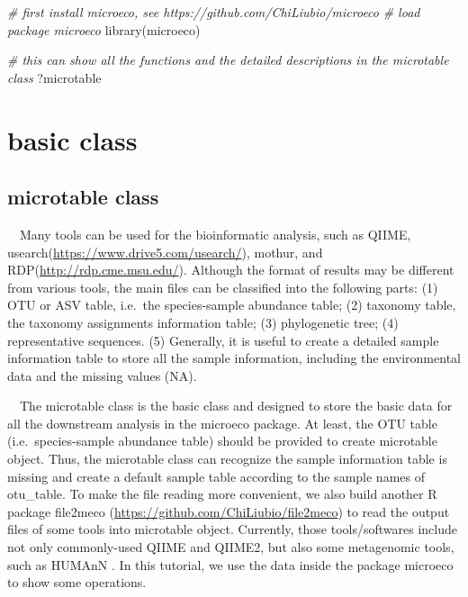 \documentclass[
]{book}
\newenvironment{Shaded}{\begin{snugshade}}{\end{snugshade}}
\newcommand{\CommentTok}[1]{\textcolor[rgb]{0.56,0.35,0.01}{\textit{#1}}}
\newcommand{\FunctionTok}[1]{\textcolor[rgb]{0.00,0.00,0.00}{#1}}
\newcommand{\NormalTok}[1]{#1}
\begin{document}
\begin{Shaded}
\begin{Highlighting}[]
\CommentTok{\# first install microeco, see https://github.com/ChiLiubio/microeco}
\CommentTok{\# load package microeco}
\FunctionTok{library}\NormalTok{(microeco)}
\end{Highlighting}
\end{Shaded}

\begin{Shaded}
\begin{Highlighting}[]
\CommentTok{\# this can show all the functions and the detailed descriptions in the microtable class}
\NormalTok{?microtable}
\end{Highlighting}
\end{Shaded}

\hypertarget{basic-class}{%
\chapter{basic class}\label{basic-class}}

\hypertarget{microtable-class}{%
\section{microtable class}\label{microtable-class}}

　Many tools can be used for the bioinformatic analysis, such as QIIME\citep{Caporaso_QIIME_2010}, usearch(\url{https://www.drive5.com/usearch/}),
mothur\citep{Schloss_Introducing_2009}, and RDP(\url{http://rdp.cme.msu.edu/}).
Although the format of results may be different from various tools, the main files can be classified into the following parts:
(1) OTU or ASV table, i.e.~the species-sample abundance table;
(2) taxonomy table, the taxonomy assignments information table;
(3) phylogenetic tree;
(4) representative sequences.
(5) Generally, it is useful to create a detailed sample information table to store all the sample information,
including the environmental data and the missing values (NA).

　The microtable class is the basic class and designed to store the basic data for all the downstream analysis in the microeco package.
At least, the OTU table (i.e.~species-sample abundance table) should be provided to create microtable object.
Thus, the microtable class can recognize the sample information table is missing and create a default sample table according to
the sample names of otu\_table.
To make the file reading more convenient,
we also build another R package file2meco (\url{https://github.com/ChiLiubio/file2meco}) to read the output files of some tools into microtable object.
Currently, those tools/softwares include not only commonly-used QIIME \citep{Caporaso_QIIME_2010} and QIIME2\citep{Bolyen_Reproducible_2019},
but also some metagenomic tools, such as HUMAnN \citep{Franzosa_Species_2018}.
In this tutorial, we use the data inside the package microeco to show some operations.
\end{document}
